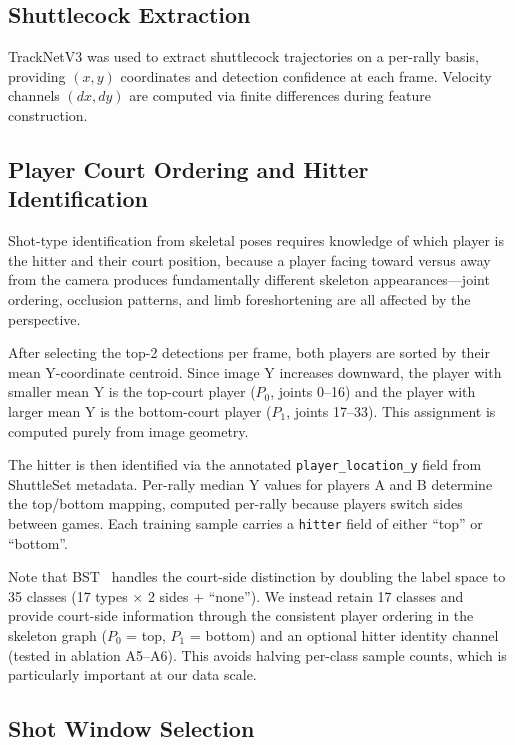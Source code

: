\documentclass[11pt,a4paper]{article}
\begin{document}
\subsection{Shuttlecock Extraction}

TrackNetV3 was used to extract shuttlecock trajectories on a per-rally basis, providing $(x, y)$ coordinates and detection confidence at each frame. Velocity channels $(dx, dy)$ are computed via finite differences during feature construction.

\subsection{Player Court Ordering and Hitter Identification}

Shot-type identification from skeletal poses requires knowledge of which player is the hitter and their court position, because a player facing toward versus away from the camera produces fundamentally different skeleton appearances---joint ordering, occlusion patterns, and limb foreshortening are all affected by the perspective.

After selecting the top-2 detections per frame, both players are sorted by their mean Y-coordinate centroid. Since image Y increases downward, the player with smaller mean Y is the top-court player ($P_0$, joints 0--16) and the player with larger mean Y is the bottom-court player ($P_1$, joints 17--33). This assignment is computed purely from image geometry.

The hitter is then identified via the annotated \texttt{player\_location\_y} field from ShuttleSet metadata. Per-rally median Y values for players A and B determine the top/bottom mapping, computed per-rally because players switch sides between games. Each training sample carries a \texttt{hitter} field of either ``top'' or ``bottom''.

Note that BST~\cite{bst} handles the court-side distinction by doubling the label space to 35 classes (17 types $\times$ 2 sides + ``none''). We instead retain 17 classes and provide court-side information through the consistent player ordering in the skeleton graph ($P_0$ = top, $P_1$ = bottom) and an optional hitter identity channel (tested in ablation A5--A6). This avoids halving per-class sample counts, which is particularly important at our data scale.

\subsection{Shot Window Selection}
\end{document}
